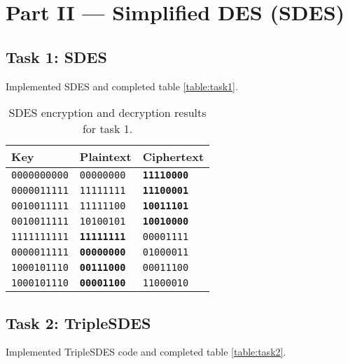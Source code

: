 \documentclass[a4paper,english,12pt]{article}
\begin{document}
\section{Part II --- Simplified DES (SDES)}

\subsection{Task 1: SDES}

Implemented SDES \cite{stallings2006cryptography} and completed table
\vref{table:task1}.

\begin{table}
  \centering
  \begin{tabular}{@{}lll@{}}
    \toprule
    Key &
    Plaintext &
    Ciphertext \\
    \midrule
    \texttt{0000000000} & \texttt{00000000} & \texttt{\textbf{11110000}} \\
    \texttt{0000011111} & \texttt{11111111} & \texttt{\textbf{11100001}} \\
    \texttt{0010011111} & \texttt{11111100} & \texttt{\textbf{10011101}} \\
    \texttt{0010011111} & \texttt{10100101} & \texttt{\textbf{10010000}} \\
    \texttt{1111111111} & \texttt{\textbf{11111111}} & \texttt{00001111} \\
    \texttt{0000011111} & \texttt{\textbf{00000000}} & \texttt{01000011} \\
    \texttt{1000101110} & \texttt{\textbf{00111000}} & \texttt{00011100} \\
    \texttt{1000101110} & \texttt{\textbf{00001100}} & \texttt{11000010} \\
    \bottomrule
  \end{tabular}
  \caption{SDES encryption and decryption results for task 1.}
  \label{table:task1}
\end{table}

\subsection{Task 2: TripleSDES}

Implemented TripleSDES code and completed table \vref{table:task2}.
\end{document}
